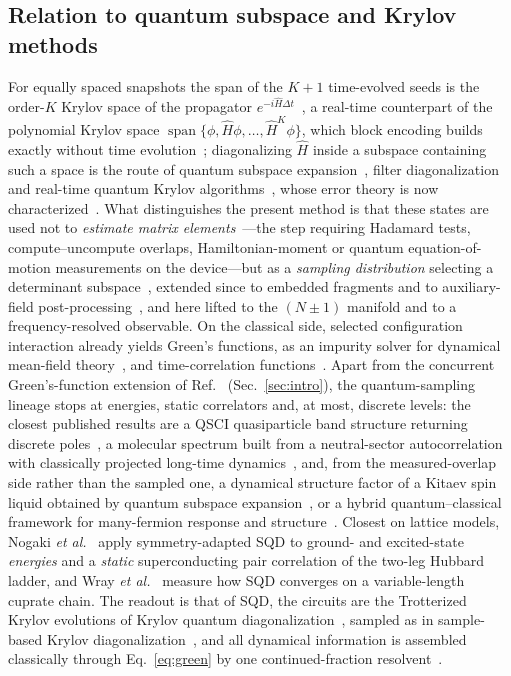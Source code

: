 \subsection{Relation to quantum subspace and Krylov methods}\label{sec:method:krylov}
For equally spaced snapshots the span of the $K{+}1$ time-evolved seeds is the order-$K$ Krylov
space of the propagator $e^{-i\hat H\Delta t}$~\cite{shen2023}, a real-time counterpart of the
polynomial Krylov space $\operatorname{span}\{\phi,\hat H\phi,\dots,\hat H^{K}\phi\}$, which block
encoding builds exactly without time evolution~\cite{kirby2023}; diagonalizing $\hat H$ inside a
subspace containing such a space is the route
of quantum subspace expansion~\cite{mcclean2017qse}, filter diagonalization~\cite{parrish2019} and
real-time quantum Krylov algorithms~\cite{cortesgray2022}, whose error theory is now
characterized~\cite{epperly2022}. What distinguishes the present method is that these states are used
not to \emph{estimate matrix elements}~\cite{bauer2016,endo2020,rungger2020,greenediniz2024,bespalova2025,onqse2024}---the step requiring Hadamard tests, compute--uncompute overlaps, Hamiltonian-moment or quantum equation-of-motion measurements on the device---but
as a \emph{sampling distribution} selecting a determinant
subspace~\cite{robledomoreno2025,kanno2023,skqd2025,teqsci2024,extsqd2025,adaptqsci,shirakawa2025},
extended since to embedded fragments and to auxiliary-field
post-processing~\cite{shajan2024,patra2026,danilov2025}, and here lifted to the $(N{\pm}1)$ manifold and to a
frequency-resolved observable. On the classical side, selected configuration interaction already
yields Green's functions, as an impurity solver for dynamical mean-field theory~\cite{mejutozaera2019},
and time-correlation functions~\cite{tdasci2024}. Apart from the concurrent Green's-function extension of Ref.~\cite{patel2026}
(Sec.~\ref{sec:intro}), the quantum-sampling lineage stops at
energies, static correlators and, at most, discrete levels: the closest published results are a QSCI quasiparticle band
structure returning discrete poles~\cite{ohgoe2025}, a molecular spectrum built from a neutral-sector
autocorrelation with classically projected long-time dynamics~\cite{santini2025}, and, from the
measured-overlap side rather than the sampled one, a dynamical structure factor of a Kitaev spin
liquid obtained by quantum subspace expansion~\cite{umeano2025}, or a hybrid quantum--classical
framework for many-fermion response and structure~\cite{du2026}. Closest on lattice models, Nogaki
\emph{et al.}~\cite{nogaki2025} apply symmetry-adapted SQD to ground- and excited-state \emph{energies} and a
\emph{static} superconducting pair correlation of the two-leg Hubbard ladder, and Wray
\emph{et al.}~\cite{wray2025} measure how SQD converges on a variable-length cuprate chain. The readout
is that of SQD, the circuits are the Trotterized Krylov evolutions of Krylov quantum
diagonalization~\cite{yoshioka2025}, sampled as in sample-based Krylov
diagonalization~\cite{skqd2025,piccinelli2025}, and all dynamical information is assembled
classically through Eq.~\eqref{eq:green} by one continued-fraction
resolvent~\cite{haydock1972,golub2010}.

